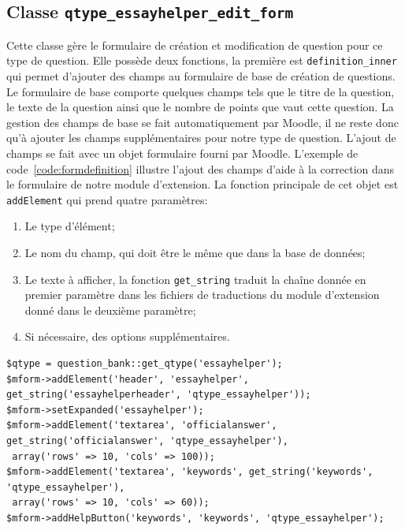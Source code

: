 \subsection*{Classe \texttt{qtype\_essayhelper\_edit\_form}}
Cette classe g\`ere le formulaire de cr\'eation et modification de question pour ce type de question.
Elle poss\`ede deux fonctions, la premi\`ere est \texttt{definition\_inner} qui permet d'ajouter des champs au formulaire de base de cr\'eation de questions.
Le formulaire de base comporte quelques champs tels que le titre de la question, le texte de la question ainsi que le nombre de points que vaut cette question.
La gestion des champs de base se fait automatiquement par Moodle, il ne reste donc qu'\`a ajouter les champs suppl\'ementaires pour notre type de question.
L'ajout de champs se fait avec un objet formulaire fourni par Moodle.
L'exemple de code~\ref{code:formdefinition} illustre l'ajout des champs d'aide \`a la correction dans le formulaire de notre module d'extension.
La fonction principale de cet objet est \texttt{addElement} qui prend quatre param\`etres:
\begin{enumerate}
  \item Le type d'\'el\'ement;
  \item Le nom du champ, qui doit \^etre le m\^eme que dans la base de donn\'ees;
  \item Le texte \`a afficher, la fonction \texttt{get\_string} traduit la cha\^ine donn\'ee en premier param\`etre dans les fichiers de traductions du module d'extension donn\'e dans le deuxi\`eme param\`etre;
  \item Si n\'ecessaire, des options suppl\'ementaires.
\end{enumerate}
\begin{lstfloat}
\begin{lstlisting}[frame=l]
$qtype = question_bank::get_qtype('essayhelper');
$mform->addElement('header', 'essayhelper', get_string('essayhelperheader', 'qtype_essayhelper'));
$mform->setExpanded('essayhelper');
$mform->addElement('textarea', 'officialanswer', get_string('officialanswer', 'qtype_essayhelper'),
 array('rows' => 10, 'cols' => 100));
$mform->addElement('textarea', 'keywords', get_string('keywords', 'qtype_essayhelper'),
 array('rows' => 10, 'cols' => 60));
$mform->addHelpButton('keywords', 'keywords', 'qtype_essayhelper');
\end{lstlisting}
\caption{Extrait du code de la fonction \texttt{definition\_inner} de la classe \texttt{qtype\_essayhelper\_edit\_form}.}
\label{code:formdefinition}
\end{lstfloat}
